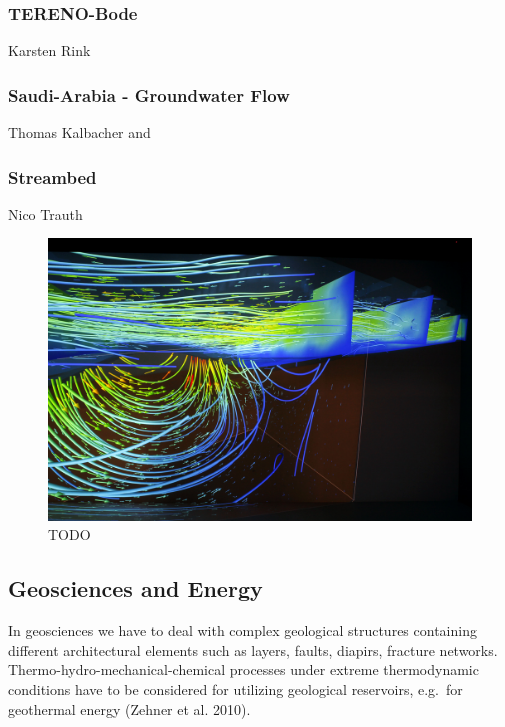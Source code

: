 \subsubsection{TERENO-Bode}\label{tereno-bode}

Karsten Rink

\subsubsection{Saudi-Arabia - Groundwater
Flow}\label{saudi-arabia---groundwater-flow}

Thomas Kalbacher \cite{zehner:modelcare} and \cite{rink:modelcare}

\subsubsection{Streambed}\label{streambed}

Nico Trauth

\begin{figure}
  \includegraphics[width=\linewidth]{images/streambed.jpg}
\caption{TODO}
\label{fig:streambed}
\end{figure}

\subsection{Geosciences and Energy}\label{geosciences-and-energy}

In geosciences we have to deal with complex geological structures
containing different architectural elements such as layers, faults,
diapirs, fracture networks. Thermo-hydro-mechanical-chemical processes
under extreme thermodynamic conditions have to be considered for
utilizing geological reservoirs, e.g.~for geothermal energy (Zehner et
al. 2010).

